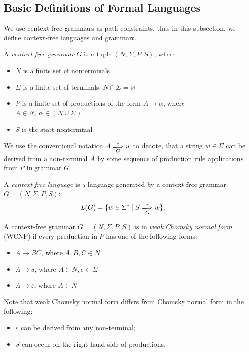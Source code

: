 \subsection{Basic Definitions of Formal Languages}
We use context-free grammars as path constraints, thus in this subsection, we define context-free languages and grammars.

\begin{definition}A \emph{context-free grammar} $G$ is a tuple $(N, \Sigma, P, S)$, where
\begin{itemize}
    \item $N$ is a finite set of nonterminals
    \item $\Sigma$ is a finite set of terminals, $N \cap \Sigma = \varnothing$
    \item $P$ is a finite set of productions of the form $A \to \alpha$, where $A \in N,\ \alpha \in (N \cup \Sigma)^*$
    \item $S$ is the start nonterminal
\end{itemize} 
\end{definition}

We use the conventional notation $A \xLongrightarrow[G]{*} w$ to denote, that a
string $w \in \Sigma$ can be derived from a non-terminal $A$ by some sequence of production rule applications from $P$ in grammar $G$.

\begin{definition} A \emph{context-free language} is a language generated by a context-free grammar $G=(N, \Sigma, P, S)$:
\begin{align*}
    L(G) &= \{w \in \Sigma^* \mid S \xLongrightarrow[G]{*} w \}.
\end{align*}
\end{definition}

\begin{definition} A context-free grammar $G = (N, \Sigma, P, S)$ is in \emph{weak Chomsky normal form} (WCNF) if every production in $P$ has one of the following forms:
    \begin{itemize}
        \item $A \rightarrow BC$, where $A, B, C \in N$
        \item  $A \rightarrow a$, where $A \in N, a \in \Sigma$
        \item $A \rightarrow \varepsilon$, where $A \in N$
    \end{itemize}
\end{definition}

Note that weak Chomsky normal form differs from Chomsky normal form in the following:
\begin{itemize}
    \item $\varepsilon$ can be derived from any non-terminal;
    \item $S$ can occur on the right-hand side of productions.
\end{itemize}

